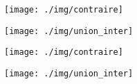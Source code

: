 \documentclass[12pt,a4paper]{article}
\date{}
\title{}
\begin{document}





\begin{multicols}{2}
	\begin{center}
		
		\texttt{[image: ./img/contraire]}
		\label{fig:contraire}
		
		
		\texttt{[image: ./img/union\_inter]}
		\label{fig:union}
	\end{center}
	
	
\end{multicols}	




\begin{multicols}{2}
	\begin{center}
		
		\texttt{[image: ./img/contraire]}
		\label{fig:contraire}
		
		
		\texttt{[image: ./img/union\_inter]}
		\label{fig:union}
	\end{center}
	
	
\end{multicols}	









	
\end{document}
